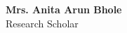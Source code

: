 \hspace{2.2in}
\begin{minipage}{4in}
\vspace{0.5in}
\begin{center}
\textbf{Mrs. Anita Arun Bhole}\\
Research Scholar
\end{center}

\end{minipage}
\clearpage
%
%
%
%


